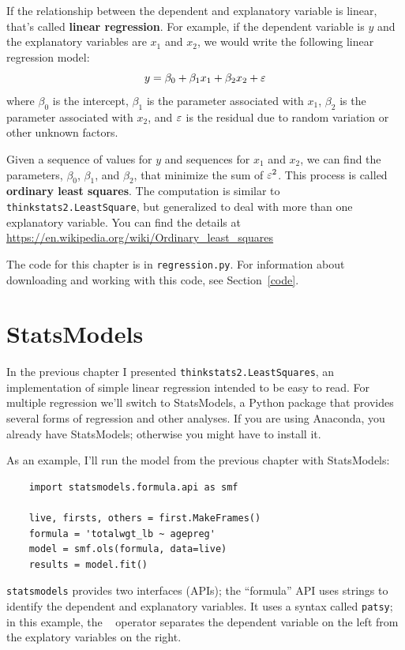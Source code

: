 \documentclass[12pt]{book}
\begin{document}
If the relationship between the dependent and explanatory variable
is linear, that's called {\bf linear regression}.  For example,
if the dependent variable is $y$ and the explanatory variables
are $x_1$ and $x_2$, we would write the following linear
regression model:
%
\[ y = \beta_0 + \beta_1 x_1 + \beta_2 x_2 + \varepsilon \]
%
where $\beta_0$ is the intercept, $\beta_1$ is the parameter
associated with $x_1$, $\beta_2$ is the parameter associated with
$x_2$, and $\varepsilon$ is the residual due to random variation or other
unknown factors.

Given a sequence of values for $y$ and sequences for $x_1$ and $x_2$,
we can find the parameters, $\beta_0$, $\beta_1$, and $\beta_2$, that
minimize the sum of $\varepsilon^2$.  This process is called
{\bf ordinary least squares}.  The computation is similar to {\tt
  thinkstats2.LeastSquare}, but generalized to deal with more than one
explanatory variable.  You can find the details at
\url{https://en.wikipedia.org/wiki/Ordinary_least_squares}

The code for this chapter is in {\tt regression.py}.  For information
about downloading and working with this code, see Section~\ref{code}.

\section{StatsModels}
\label{statsmodels}

In the previous chapter I presented {\tt thinkstats2.LeastSquares}, an
implementation of simple linear regression intended to be easy to
read.  For multiple regression we'll switch to StatsModels, a Python
package that provides several forms of regression and other
analyses.  If you are using Anaconda, you already have StatsModels;
otherwise you might have to install it.

As an example, I'll run the model from the previous chapter with
StatsModels:

\begin{verbatim}
    import statsmodels.formula.api as smf

    live, firsts, others = first.MakeFrames()
    formula = 'totalwgt_lb ~ agepreg'
    model = smf.ols(formula, data=live)
    results = model.fit()
\end{verbatim}

{\tt statsmodels} provides two interfaces (APIs); the ``formula''
API uses strings to identify the dependent and explanatory variables.
It uses a syntax called {\tt patsy}; in this example, the {\tt ~}
operator separates the dependent variable on the left from the
explatory variables on the right.
\end{document}
